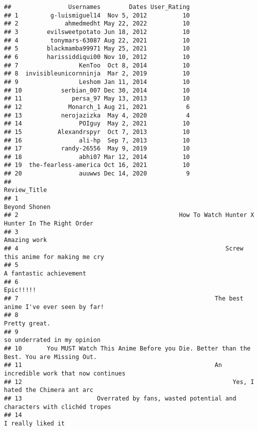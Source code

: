 \documentclass[
]{article}
\begin{document}
\begin{verbatim}
##                Usernames        Dates User_Rating
## 1         g-luismiguel14  Nov 5, 2012          10
## 2             ahmedmedht May 22, 2022          10
## 3        evilsweetpotato Jun 18, 2012          10
## 4         tonymars-63087 Aug 22, 2021          10
## 5        blackmamba99971 May 25, 2021          10
## 6        harissiddiqui00 Nov 10, 2012          10
## 7                 KenToo  Oct 8, 2014          10
## 8  invisibleunicornninja  Mar 2, 2019          10
## 9                 Leshom Jan 11, 2014          10
## 10           serbian_007 Dec 30, 2014          10
## 11              persa_97 May 13, 2013          10
## 12             Monarch_1 Aug 21, 2021           6
## 13           nerojazizka  May 4, 2020           4
## 14                POIguy  May 2, 2021          10
## 15          Alexandrspyr  Oct 7, 2013          10
## 16                ali-hp  Sep 7, 2013          10
## 17           randy-26556  May 9, 2019          10
## 18                abhi07 Mar 12, 2014          10
## 19  the-fearless-america Oct 16, 2021          10
## 20                auuwws Dec 14, 2020           9
##                                                                                  Review_Title
## 1                                                                               Beyond Shonen
## 2                                             How To Watch Hunter X Hunter In The Right Order
## 3                                                                                Amazing work
## 4                                                          Screw this anime for making me cry
## 5                                                                     A fantastic achievement
## 6                                                                                   Epic!!!!!
## 7                                                       The best anime I've ever seen by far!
## 8                                                                               Pretty great.
## 9                                                                 so underrated in my opinion
## 10       You MUST Watch This Anime Before you Die. Better than the Best. You are Missing Out.
## 11                                                      An incredible work that now continues
## 12                                                           Yes, I hated the Chimera ant arc
## 13                     Overrated by fans, wasted potential and characters with clichéd tropes
## 14                                                                          I really liked it

\end{verbatim}
\end{document}
